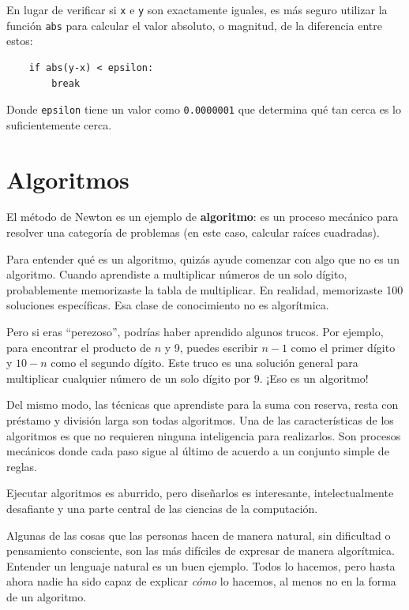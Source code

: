 \documentclass[10pt]{book}
\begin{document}
En lugar de verificar si {\tt x} e {\tt y} son exactamente iguales, es
más seguro utilizar la función {\tt abs} para calcular el
valor absoluto, o magnitud, de la diferencia entre estos:

\begin{verbatim}
    if abs(y-x) < epsilon:
        break
\end{verbatim}
%
Donde \verb"epsilon" tiene un valor como {\tt 0.0000001} que
determina qué tan cerca es lo suficientemente cerca.


\section{Algoritmos}

El método de Newton es un ejemplo de {\bf algoritmo}: es un
proceso mecánico para resolver una categoría de problemas (en este
caso, calcular raíces cuadradas).

Para entender qué es un algoritmo, quizás ayude comenzar con
algo que no es un algoritmo.  Cuando aprendiste a multiplicar
números de un solo dígito, probablemente memorizaste la tabla de multiplicar.
En realidad, memorizaste 100 soluciones específicas.  Esa clase de
conocimiento no es algorítmica.

Pero si eras ``perezoso'', podrías haber aprendido algunos
trucos.  Por ejemplo, para encontrar el producto de $n$ y 9, puedes
escribir $n-1$ como el primer dígito y $10-n$ como el segundo
dígito.  Este truco es una solución general para multiplicar cualquier
número de un solo dígito por 9.  ¡Eso es un algoritmo!

Del mismo modo, las técnicas que aprendiste para la suma con reserva,
resta con préstamo y división larga son todas algoritmos.  Una
de las características de los algoritmos es que no requieren ninguna
inteligencia para realizarlos.  Son procesos mecánicos donde
cada paso sigue al último de acuerdo a un conjunto simple de reglas.

Ejecutar algoritmos es aburrido, pero diseñarlos es interesante,
intelectualmente desafiante y una parte central de las ciencias de la computación.

Algunas de las cosas que las personas hacen de manera natural, sin dificultad o
pensamiento consciente, son las más difíciles de expresar de manera algorítmica.
Entender un lenguaje natural es un buen ejemplo.  Todos lo hacemos, pero
hasta ahora nadie ha sido capaz de explicar {\em cómo} lo hacemos, al menos
no en la forma de un algoritmo.
\end{document}
